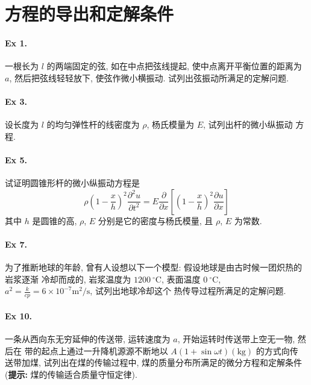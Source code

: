 \section{方程的导出和定解条件}
\paragraph{Ex 1.}
一根长为 $l$ 的两端固定的弦, 如在中点把弦线提起, 使中点离开平衡位置的距离为 $a$,
然后把弦线轻轻放下, 使弦作微小横振动. 试列出弦振动所满足的定解问题.

\paragraph{Ex 3.}
设长度为 $l$ 的均匀弹性杆的线密度为 $\rho$, 杨氏模量为 $E$, 试列出杆的微小纵振动
方程.

\paragraph{Ex 5.}
试证明圆锥形杆的微小纵振动方程是
\[
\rho (1 - \frac{x}{h})^2 \frac{\partial^2 u}{\partial t^2}
= E \frac{\partial}{\partial x}
[(1 - \frac{x}{h})^2 \frac{\partial u}{\partial x} ]
\]
其中 $h$ 是圆锥的高, $\rho$, $E$ 分别是它的密度与杨氏模量, 且 $\rho$, $E$ 为常数.

\paragraph{Ex 7.}
为了推断地球的年龄, 曾有人设想以下一个模型: 假设地球是由古时候一团炽热的岩浆逐渐
冷却而成的, 岩浆温度为 $1200\ ^\circ \text{C}$, 表面温度 $0\ ^\circ \text{C}$,
$a^2 = \frac{k}{cp} = 6 \times 10^{-7} \text{m}^2/\text{s}$, 试列出地球冷却这个
热传导过程所满足的定解问题.

\paragraph{Ex 10.}
一条从西向东无穷延伸的传送带, 运转速度为 $a$, 开始运转时传送带上空无一物, 然后在
带的起点上通过一升降机源源不断地以 $A (1 + \sin \omega t)(\text{kg})$ 的方式向传
送带加煤, 试列出在煤的传输过程中, 煤的质量分布所满足的微分方程和定解条件
({\bf 提示:} 煤的传输适合质量守恒定律).


